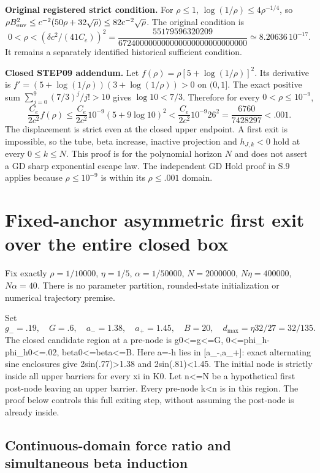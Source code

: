 \documentclass[11pt,a4paper]{article}
\begin{document}
\textbf{Original registered strict condition.} For $\rho\le1$,
$\log(1/\rho)\le4\rho^{-1/4}$, so
$\rho B_{\rm env}^2\le c^{-2}(50\rho+32\sqrt\rho)\le82c^{-2}\sqrt\rho$.
The original condition is
\[
 0<\rho<(\delta c^2/(41C_e))^2
 =\frac{55179596320209}{672400000000000000000000000000}
 \simeq8.20636\,10^{-17}.
\]
It remains a separately identified historical sufficient condition.

\textbf{Closed STEP09 addendum.} Let $f(\rho)=\rho[5+\log(1/\rho)]^2$. Its derivative is
$f'=(5+\log(1/\rho))(3+\log(1/\rho))>0$ on $(0,1]$. The exact positive sum $\sum_{j=0}^9(7/3)^j/j!>10$ gives $\log10<7/3$. Therefore for every $0<\rho\le10^{-9}$,
\[
 \frac{C_e}{2c^2}f(\rho)
 \le\frac{C_e}{2c^2}10^{-9}(5+9\log10)^2
 <\frac{C_e}{2c^2}10^{-9}26^2
 =\frac{6760}{7428297}<.001 .
\]
The displacement is strict even at the closed upper endpoint. A first exit is impossible, so the tube, beta increase, inactive projection and $h_{J,k}<0$ hold at every $0\le k\le N$. This proof is for the polynomial horizon $N$ and does not assert a GD sharp exponential escape law. The independent GD Hold proof in S.9 applies because $\rho\le10^{-9}$ is within its $\rho\le.001$ domain.

\section{Fixed-anchor asymmetric first exit over the entire closed box}

Fix exactly $\rho=1/10000$, $\eta=1/5$, $\alpha=1/50000$,
$N=2000000$, $N\eta=400000$, $N\alpha=40$. There is no parameter partition, rounded-state initialization or numerical trajectory premise.

Set
\[
 g_-=.19,\quad G=.6,\quad a_- =1.38,\quad a_+=1.45,\quad
 B=20,\quad d_{\max}=\eta32/27=32/135.
\]
The closed candidate region at a pre-node is
g0<=g<=G, 0<=phi\_h-phi\_h0<=.02, beta0<=beta<=B.
Here a=-h lies in [a\_-,a\_+]: exact alternating sine enclosures give
2sin(.77)>1.38 and 2sin(.81)<1.45. The initial node is strictly inside
all upper barriers for every xi in K0. Let n<=N be a hypothetical first
post-node leaving an upper barrier. Every pre-node k<n is in this region.
The proof below controls this full exiting step, without assuming the
post-node is already inside.

\subsection{Continuous-domain force ratio and simultaneous beta induction}
\end{document}
